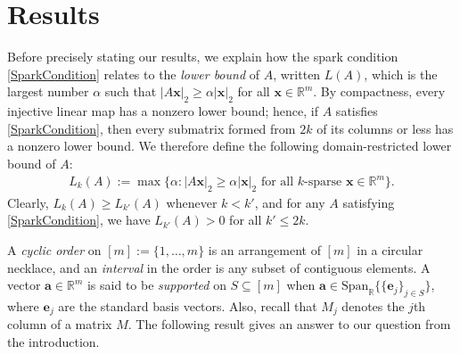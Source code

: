 \documentclass[journal, twocolumn]{IEEEtran}
\begin{document}
\section{Results}\label{Results}

Before precisely stating our results, we explain how the spark condition \eqref{SparkCondition} relates to the \emph{lower bound} \cite{Grcar10} of $A$, written $L(A)$, which is the largest number $\alpha$ such that \mbox{$|A\mathbf{x}|_2 \geq \alpha|\mathbf{x}|_2$} for all $\mathbf{x} \in \mathbb{R}^m$. By compactness, every injective linear map has a nonzero lower bound; hence, if $A$ satisfies \eqref{SparkCondition}, then every submatrix formed from $2k$ of its columns or less has a nonzero lower bound. We therefore define the following domain-restricted lower bound of $A$:
\begin{align*}
L_k(A) := \max \{ \alpha : |A\mathbf{x}|_2 \geq \alpha|\mathbf{x}|_2 \text{ for all $k$-sparse } \mathbf{x} \in \mathbb{R}^m\}.
\end{align*} 
Clearly, $L_k(A) \geq L_{k'}(A)$ whenever $k < k'$, and for any $A$ satisfying \eqref{SparkCondition}, we have $L_{k'}(A) > 0$ for all $k' \leq 2k$. 

A \textit{cyclic order} on $[m] := \{1, \ldots,m\}$ is an arrangement of $[m]$ in a circular necklace, and an \textit{interval} in the order is any subset of contiguous elements. A vector $\mathbf{a} \in \mathbb{R}^m$ is said to be \emph{supported} on $S \subseteq [m]$ when $\mathbf{a} \in \text{Span}_{\mathbb R}\{ \{\mathbf{e}_j\}_{j\in S}\}$, where $\mathbf{e}_j$ are the standard basis vectors.  Also, recall that $M_j$ denotes the $j$th column of a matrix $M$. The following result gives an answer to our question from the introduction.
\end{document}
